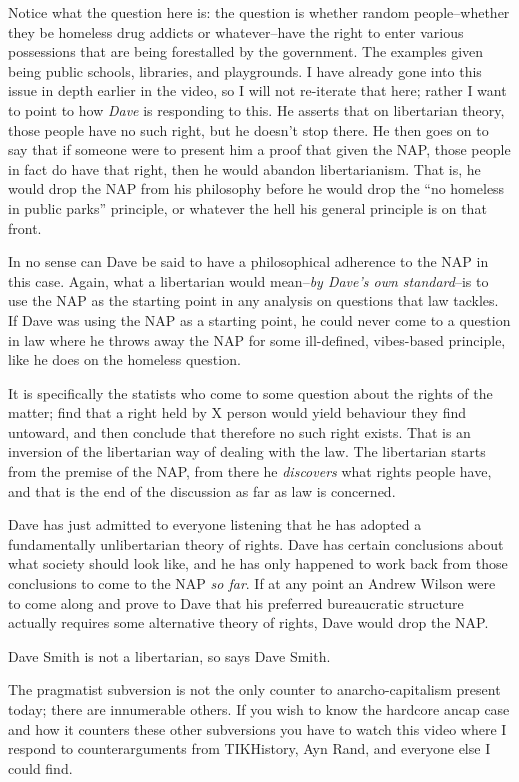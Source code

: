\documentclass[11pt]{article}
\begin{document}
Notice what the question here is: the question is whether random people--whether they be homeless drug addicts or whatever--have the right to enter various possessions that are being forestalled by the government. The examples given being public schools, libraries, and playgrounds. I have already gone into this issue in depth earlier in the video, so I will not re-iterate that here; rather I want to point to how \emph{Dave} is responding to this. He asserts that on libertarian theory, those people have no such right, but he doesn't stop there. He then goes on to say that if someone were to present him a proof that given the NAP, those people in fact do have that right, then he would abandon libertarianism. That is, he would drop the NAP from his philosophy before he would drop the ``no homeless in public parks'' principle, or whatever the hell his general principle is on that front.

In no sense can Dave be said to have a philosophical adherence to the NAP in this case. Again, what a libertarian would mean--\emph{by Dave's own standard}--is to use the NAP as the starting point in any analysis on questions that law tackles. If Dave was using the NAP as a starting point, he could never come to a question in law where he throws away the NAP for some ill-defined, vibes-based principle, like he does on the homeless question.

It is specifically the statists who come to some question about the rights of the matter; find that a right held by X person would yield behaviour they find untoward, and then conclude that therefore no such right exists. That is an inversion of the libertarian way of dealing with the law. The libertarian starts from the premise of the NAP, from there he \emph{discovers} what rights people have, and that is the end of the discussion as far as law is concerned.

Dave has just admitted to everyone listening that he has adopted a fundamentally unlibertarian theory of rights. Dave has certain conclusions about what society should look like, and he has only happened to work back from those conclusions to come to the NAP \emph{so far}. If at any point an Andrew Wilson were to come along and prove to Dave that his preferred bureaucratic structure actually requires some alternative theory of rights, Dave would drop the NAP.

Dave Smith is not a libertarian, so says Dave Smith.

The pragmatist subversion is not the only counter to anarcho-capitalism present today; there are innumerable others. If you wish to know the hardcore ancap case and how it counters these other subversions you have to watch this video where I respond to counterarguments from TIKHistory, Ayn Rand, and everyone else I could find.
\end{document}

